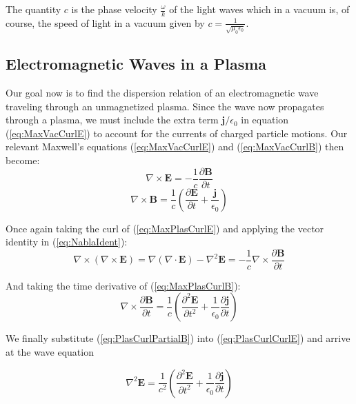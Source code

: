 \documentclass[twocolumn]{article}
\begin{document}
The quantity $c$ is the phase velocity $\frac{\omega}{k}$ of the light waves which in a vacuum is, of course, the speed of light in a vacuum given by $c = \frac{1}{\sqrt{\mu_0\epsilon_0}}$.

\subsection*{Electromagnetic Waves in a Plasma}
Our goal now is to find the dispersion relation of an electromagnetic wave traveling through an unmagnetized plasma.
Since the wave now propagates through a plasma, we must include the extra term $\mathbf{j}/\epsilon_0$ in equation (\ref{eq:MaxVacCurlE}) to account for the currents of charged particle motions.
Our relevant Maxwell's equations (\ref{eq:MaxVacCurlE}) and (\ref{eq:MaxVacCurlB}) then become:
\begin{equation}
	\label{eq:MaxPlasCurlE}
	\nabla \times \mathbf{E} = -\frac{1}{c} \frac{\partial \mathbf{B}}{\partial t}
\end{equation}
\begin{equation}
	\label{eq:MaxPlasCurlB}
	\nabla \times \mathbf{B} = \frac{1}{c} (\frac{\partial \mathbf{E}}{\partial t} + \frac{\mathbf{j}}{\epsilon_0})
\end{equation}

Once again taking the curl of (\ref{eq:MaxPlasCurlE}) and applying the vector identity in (\ref{eq:NablaIdent}):
\begin{equation}
	\label{eq:PlasCurlCurlE}
	\nabla \times (\nabla \times \mathbf{E}) = \nabla(\nabla \cdot \mathbf{E}) - \nabla^2 \mathbf{E} = -\frac{1}{c}\nabla \times \frac{\partial \mathbf{B}}{\partial t}
\end{equation}

And taking the time derivative of (\ref{eq:MaxPlasCurlB}):
\begin{equation}
	\label{eq:PlasCurlPartialB}
	\nabla \times \frac{\partial \mathbf{B}}{\partial t} = \frac{1}{c}(\frac{\partial^2 \mathbf{E}}{\partial t^2} + \frac{1}{\epsilon_0} \frac{\partial \mathbf{j}}{\partial t})
\end{equation}

We finally substitute (\ref{eq:PlasCurlPartialB}) into (\ref{eq:PlasCurlCurlE}) and arrive at the wave equation

\begin{equation}
	\nabla^2 \mathbf{E} = \frac{1}{c^2}(\frac{\partial^2 \mathbf{E}}{\partial t^2} + \frac{1}{\epsilon_0} \frac{\partial \mathbf{j}}{\partial t})
\end{equation}
\end{document}
